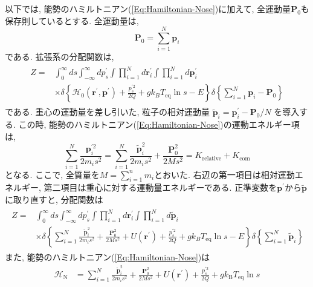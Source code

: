以下では, 能勢のハミルトニアン(\ref{Eq:Hamiltonian-Nose})に加えて, 全運動量$\bm{P}_{0}$も保存則しているとする. 全運動量は, 
\begin{equation}
  \bm{P}_{0} = \sum_{i=1}^{N}\bm{p}_{i}
\end{equation}
である. 
拡張系の分配関数は, 
\begin{align}
  \begin{split}
  Z =&
  \int_{0}^{\infty} ds
  \int_{- \infty}^{\infty} dp^{\prime}_{s}
  \int \prod_{i=1}^{N} d \bm{r}_{i}^{\prime}
  \int \prod_{i=1}^{N} d \bm{p}_{i}^{\prime} ~\\
  &\times
  \delta
  \left\{
    \mathcal{H}_{0} \left(\bm{r}^{\prime}, \bm{p}^{\prime}\right) +
    \frac{p^{\prime 2}_{s}}{2Q} + g k_B T_{\mathrm{eq}} \ln s - E
  \right\}
  \delta
  \left\{
    \sum_{i=1}^{N}\bm{p}_{i} - \bm{P}_{0}
  \right\}
  \end{split}
\end{align}
である. 
重心の運動量を差し引いた, 粒子の相対運動量
$\tilde{\bm{p}}_{i} = \bm{p}_{i}^{\prime} - \bm{P}_{0}/N$
を導入する. 
この時, 能勢のハミルトニアン(\ref{Eq:Hamiltonian-Nose})の運動エネルギー項は, 
\begin{equation}
  \sum_{i=1}^{N} \frac{\bm{p}_{i}^{\prime 2}}{2m_{i}s^{2}} =
  \sum_{i=1}^{N} \frac{\tilde{\bm{p}}_{i}^{2}}{2m_{i}s^{2}} +
  \frac{\bm{P}_{0}^2}{2Ms^{2}} =
  K_{\mathrm{relative}} + K_{\mathrm{com}}
\end{equation}
となる. ここで, 全質量を$M=\sum_{i=1}^{n}m_{i}$とおいた. 
右辺の第一項目は相対運動エネルギー, 第二項目は重心に対する運動量エネルギーである. 
正準変数を$\bm{p}^{\prime}$から$\tilde{\bm{p}}$に取り直すと, 分配関数は
\begin{align}
  \begin{split}
  Z =&
  \int_{0}^{\infty} ds
  \int_{- \infty}^{\infty} dp^{\prime}_{s}
  \int \prod_{i=1}^{N} d \bm{r}_{i}^{\prime}
  \int \prod_{i=1}^{N} d \tilde{\bm{p}}_{i} ~\\
  &\times
  \delta
  \left\{
    \sum_{i=1}^{N} \frac{\tilde{\bm{p}}_{i}^{2}}{2m_{i}s^{2}} +
    \frac{\bm{P}_{0}^2}{2Ms^{2}} +
    U(\bm{r}^{\prime}) +
    \frac{p^{\prime 2}_{s}}{2Q} + g k_B T_{\mathrm{eq}} \ln s - E
  \right\}
  \delta
  \left\{
    \sum_{i=1}^{N}\tilde{\bm{p}}_{i}
  \right\}
  \end{split}
\end{align}
また, 能勢のハミルトニアン(\ref{Eq:Hamiltonian-Nose})は
\begin{align}
  \mathcal{H}_{\mathrm{N}} &=
  \sum_{i=1}^{N} \frac{\tilde{\bm{p}}_{i}^{2}}{2m_{i}s^{2}} +
  \frac{\bm{P}_{0}^2}{2Ms^{2}} +
  U(\bm{r}^{\prime}) +
  \frac{p_{s}^{\prime 2}}{2Q} +
  g k_{\mathrm{B}}T_{\mathrm{eq}} \ln s
  \label{Eq:Hamiltonian-Nose2}
\end{align}
